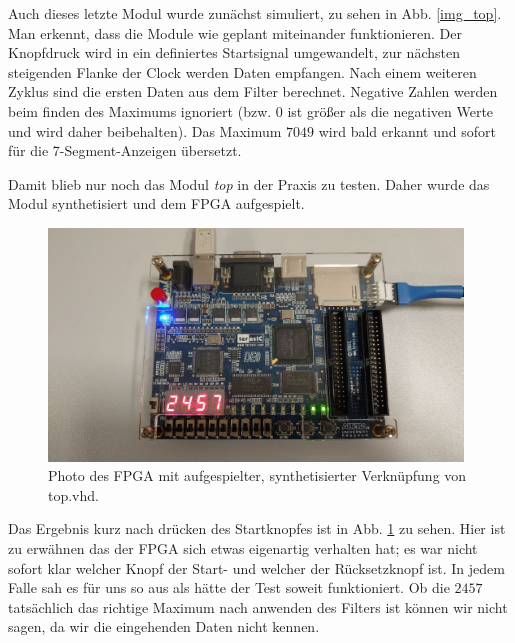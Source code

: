 Auch dieses letzte Modul wurde zunächst simuliert, zu sehen in Abb. \ref{img_top}.
Man erkennt, dass die Module wie geplant miteinander funktionieren.
Der Knopfdruck wird in ein definiertes Startsignal umgewandelt, zur nächsten steigenden Flanke der Clock werden Daten empfangen.
Nach einem weiteren Zyklus sind die ersten Daten aus dem Filter berechnet.
Negative Zahlen werden beim finden des Maximums ignoriert (bzw. $0$ ist größer als die negativen Werte und wird daher beibehalten).
Das Maximum $7049$ wird bald erkannt und sofort für die 7-Segment-Anzeigen übersetzt.

Damit blieb nur noch das Modul \textit{top} in der Praxis zu testen.
Daher wurde das Modul synthetisiert und dem FPGA aufgespielt.

\begin{figure}[ht]
	\centering
    \includegraphics[width=0.98\textwidth]{../Daten/Photo_FPGA_top.png}
	\caption{Photo des FPGA mit aufgespielter, synthetisierter Verknüpfung von top.vhd.}
	\label{photo_top}
\end{figure}

Das Ergebnis kurz nach drücken des Startknopfes ist in Abb. \ref{photo_top} zu sehen.
Hier ist zu erwähnen das der FPGA sich etwas eigenartig verhalten hat; es war nicht sofort klar welcher Knopf der Start- und welcher der Rücksetzknopf ist.
In jedem Falle sah es für uns so aus als hätte der Test soweit funktioniert.
Ob die $2457$ tatsächlich das richtige Maximum nach anwenden des Filters ist können wir nicht sagen, da wir die eingehenden Daten nicht kennen.
